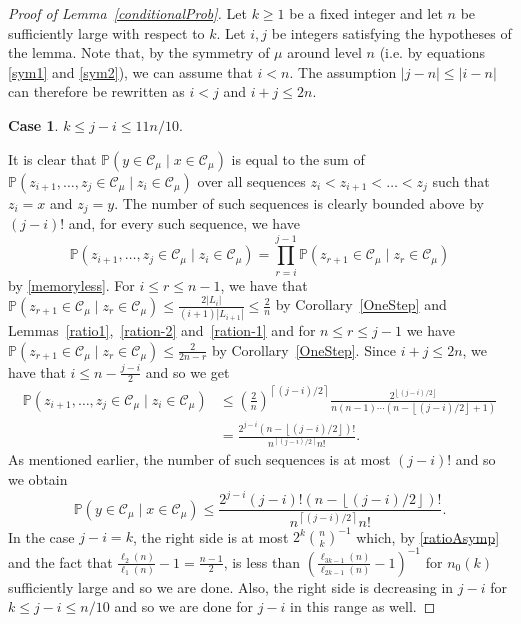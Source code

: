 \documentclass[11 pt]{article}
\theoremstyle{definition}
\theoremstyle{case}
\newtheorem{case4}{Case}
\numberwithin{equation}{section}
\begin{document}
\begin{proof}[Proof of Lemma~\ref{conditionalProb}]
Let $k\geq 1$ be a fixed integer and let $n$ be sufficiently large with respect to $k$. Let $i,j$ be integers satisfying the hypotheses of the lemma. Note that, by the symmetry of $\mu$ around level $n$ (i.e. by equations \eqref{sym1} and \eqref{sym2}), we can assume that $i<n$. The assumption $|j-n|\leq |i-n|$ can therefore be rewritten as $i<j$ and $i+j\leq 2n$. 

\begin{case4}
\label{smallGap}
$k\leq j-i\leq 11n/10$.
\end{case4}

It is clear that $\mathbb{P}\left(y\in \mathcal{C}_\mu\mid x\in\mathcal{C}_\mu\right)$ is equal to the sum of $\mathbb{P}\left(z_{i+1},\dots,z_{j}\in \mathcal{C}_\mu\mid z_i\in\mathcal{C}_\mu\right)$ over all sequences $z_i<z_{i+1}<\dots<z_{j}$ such that $z_i=x$ and $z_{j}=y$. The number of such sequences is clearly bounded above by $(j-i)!$ and, for every such sequence, we have
\[\mathbb{P}\left(z_{i+1},\dots,z_{j}\in \mathcal{C}_\mu\mid z_i\in\mathcal{C}_\mu\right) = \prod_{r=i}^{j-1}\mathbb{P}\left(z_{r+1}\in \mathcal{C}_\mu\mid z_r\in\mathcal{C}_\mu\right)\]
by \eqref{memoryless}. For $i\leq r\leq n-1$, we have that $\mathbb{P}\left(z_{r+1}\in \mathcal{C}_\mu\mid z_r\in\mathcal{C}_\mu\right) \leq \frac{2|L_i|}{(i+1)|L_{i+1}|}\leq \frac{2}{n}$ by Corollary~\ref{OneStep} and Lemmas~\ref{ratio1},~\ref{ration-2} and~\ref{ration-1} and for $n\leq r\leq j-1$ we have $\mathbb{P}\left(z_{r+1}\in \mathcal{C}_\mu\mid z_r\in\mathcal{C}_\mu\right) \leq \frac{2}{2n-r}$ by Corollary~\ref{OneStep}. Since $i+j\leq 2n$, we have that $i\leq n-\frac{j-i}{2}$ and so we get 
\begin{align*}
\mathbb{P}\left(z_{i+1},\dots,z_{j}\in \mathcal{C}_\mu\mid z_i\in\mathcal{C}_\mu\right)& \leq \left(\frac{2}{n}\right)^{\left\lceil (j-i)/2\right\rceil}\frac{2^{\left\lfloor (j-i)/2\right\rfloor}}{n(n-1)\cdots (n-\left\lfloor (j-i)/2\right\rfloor + 1)}\\
& = \frac{2^{j-i} (n-\left\lfloor(j-i)/2\right\rfloor)!}{n^{\left\lceil (j-i)/2\right\rceil}n!}.\end{align*}
As mentioned earlier, the number of such sequences is at most $(j-i)!$ and so we obtain
\begin{equation}\label{j-iBound}\mathbb{P}\left(y\in \mathcal{C}_\mu\mid x\in\mathcal{C}_\mu\right) \leq \frac{2^{j-i} (j-i)!(n-\left\lfloor(j-i)/2\right\rfloor)!}{n^{\left\lceil (j-i)/2\right\rceil}n!}.\end{equation}
In the case $j-i=k$, the right side is at most $2^{k}\binom{n}{k}^{-1}$ which, by \eqref{ratioAsymp} and the fact that $\frac{\ell_2(n)}{\ell_1(n)} - 1 = \frac{n-1}{2}$, is less than $\left(\frac{\ell_{3k-1}(n)}{\ell_{2k-1}(n)} - 1\right)^{-1}$ for $n_0(k)$ sufficiently large and so we are done. Also, the right side is decreasing in $j-i$ for $k\leq j-i\leq n/10$ and so we are done for $j-i$ in this range as well. 


\end{proof}
\end{document}

